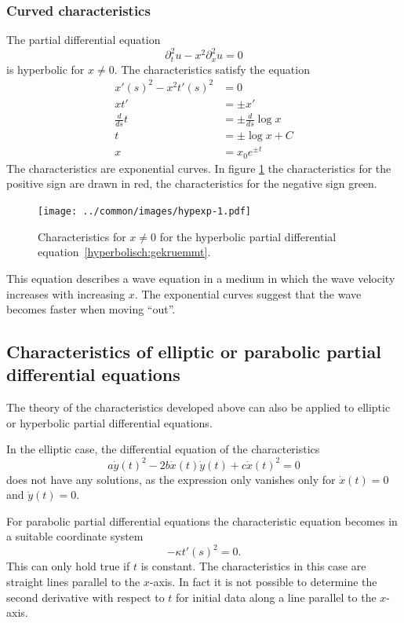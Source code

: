 \subsubsection{Curved characteristics}
The partial differential equation
\begin{equation}
\partial_t^2u-x^2\partial_x^2u=0
\label{hyperbolisch:gekruemmt}
\end{equation}
is hyperbolic for $x\ne 0$.
The characteristics satisfy the equation
\begin{align*}
x'(s)^2-x^2t'(s)^2&=0
\\
xt'&=\pm  x'
\\
\frac{d}{ds}t&=\pm\frac{d}{ds}\log x
\\
t&=\pm\log x+C
\\
x&=x_0e^{\pm t}
\end{align*}
The characteristics are exponential curves.
In figure \ref{hyp:exp}
the characteristics for the positive sign are drawn in red,
the characteristics for the negative sign green.
\begin{figure}
\begin{center}
\texttt{[image: ../common/images/hypexp-1.pdf]}
\end{center}
\caption{Characteristics for $x\ne 0$ for the hyperbolic partial
differential equation~\eqref{hyperbolisch:gekruemmt}.
\label{hyp:exp}}
\end{figure}

This equation describes a wave equation in a medium in which
the wave velocity increases with increasing $x$.
The exponential curves suggest that the wave becomes faster when moving ``out''.

\subsection{Characteristics of elliptic or parabolic partial differential
equations}
The theory of the characteristics developed above can also be
applied to elliptic or hyperbolic partial differential equations.

In the elliptic case, the differential equation of the characteristics
\[
a\dot y(t)^2-2b\dot x(t)\dot y(t)+c\dot x(t)^2=0
\]
does not have any solutions, as the expression only vanishes only for
$\dot x(t)=0$ and $\dot y(t)=0$.

For parabolic partial differential equations the characteristic
equation becomes in a suitable coordinate system
\[
-\kappa t'(s)^2=0.
\]
This can only hold true if $t$ is constant.
The characteristics in this case are straight lines parallel
to the $x$-axis.
In fact it is not possible to determine the second derivative
with respect to $t$ for initial data along a line parallel
to the $x$-axis.


